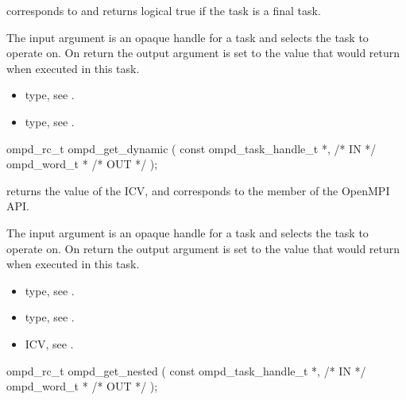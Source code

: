 \descr
{} corresponds to  and returns
logical true if the task is a final task.

\argdesc
The input argument  is an opaque handle for a task and selects the task to operate on.
On return the output argument  is set to the value that  would return when
executed in this task.

\crossreferences
\begin{itemize}
	\item {} type, see .
	\item {} type, see .
\end{itemize}


\summary

\format
\cspecificstart
\begin{boxedcode}
ompd\_rc\_t ompd\_get\_dynamic (
  const ompd\_task\_handle\_t  *,                           /* IN */
  ompd\_word\_t              *                                   /* OUT */
);
\end{boxedcode}
\cspecificend

\descr
{} returns the value of the
 ICV,
and corresponds to the  member of the OpenMPI API.

\argdesc
The input argument  is an opaque handle for a task and selects the task to operate on.
On return the output argument  is set to the value that  would return when
executed in this task.

\crossreferences
\begin{itemize}
	\item {} type, see .
	\item {} type, see .
	\item {} ICV, see .
\end{itemize}


\summary

\format
\cspecificstart
\begin{boxedcode}
ompd\_rc\_t ompd\_get\_nested (
  const ompd\_task\_handle\_t  *,                           /* IN */
  ompd\_word\_t              *                                   /* OUT */
);
\end{boxedcode}
\cspecificend

